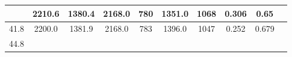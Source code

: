 \documentclass[a4paper,12pt]{article}
\begin{document}
\begin{longtable}{
     |
%    
    c|
%    
    c|
%    
    c|
%    
    c|
%    
    c|
%    
    c|
%    
    c|
%    
    c|
%    
    c|
%    
    c|
%    
    }
%        
        & 2210.6
%        

%        

%        
        & 1380.4
%        

%        

%        
        & 2168.0
%        

%        

%        
        & 780
%        

%        

%        
        & 1351.0
%        

%        

%        
        & 1068
%        

%        

%        
        & 0.306
%        

%        

%        
        & 0.65
%        

%        
        \\
        \hline

        

%        

%        
        41.8
%        

%        

%        
        & 2200.0
%        

%        

%        
        & 1381.9
%        

%        

%        
        & 2168.0
%        

%        

%        
        & 783
%        

%        

%        
        & 1396.0
%        

%        

%        
        & 1047
%        

%        

%        
        & 0.252
%        

%        

%        
        & 0.679
%        

%        
        \\
        \hline

        

%        

%        
        44.8
%        

%        


\end{longtable}
\end{document}
